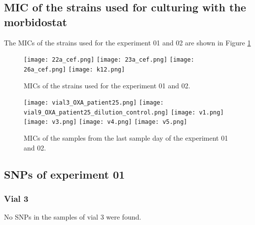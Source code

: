 \subsection{MIC of the strains used for culturing with the morbidostat}
The MICs of the strains used for the experiment 01 and 02 are shown in Figure \ref{figure:mic_ogs}
\begin{figure}[H]
	\texttt{[image: 22a\_cef.png]}
	\texttt{[image: 23a\_cef.png]}
	\texttt{[image: 26a\_cef.png]}
	\texttt{[image: k12.png]}
	\caption{MICs of the strains used for the experiment 01 and 02.}
	\label{figure:mic_ogs}
\end{figure}
\begin{figure}[H]
	\texttt{[image: vial3\_OXA\_patient25.png]}
	\texttt{[image: vial9\_OXA\_patient25\_dilution\_control.png]}
	\texttt{[image: v1.png]}
	\texttt{[image: v3.png]}
	\texttt{[image: v4.png]}
	\texttt{[image: v5.png]}
	\label{figure:mics_finish}
	\caption{MICs of the samples from the last sample day of the experiment 01 and 02.}
\end{figure}
\subsection{SNPs of experiment 01}
\subsubsection{Vial 3}
No SNPs in the samples of vial 3 were found.
